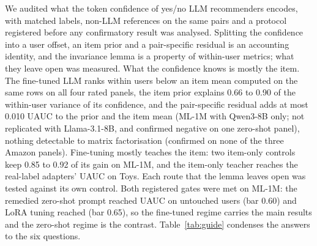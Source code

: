 We audited what the token confidence of yes/no LLM recommenders encodes, with matched labels, non-LLM references on the same pairs
and a protocol registered before any confirmatory result was analysed. Splitting the confidence into a user offset, an item prior
and a pair-specific residual is an accounting identity, and the invariance lemma is a property of within-user metrics; what they
leave open was measured.
What the confidence knows is mostly the item. The fine-tuned LLM ranks within users below an item mean computed on the same rows on
all four rated panels, the item prior explains 0.66 to 0.90 of the within-user variance of its confidence, and the pair-specific
residual adds at most 0.010 UAUC to the prior and the item mean (ML-1M with Qwen3-8B only; not replicated with Llama-3.1-8B, and
confirmed negative on one zero-shot panel), nothing detectable to matrix factorisation (confirmed on none of the three Amazon
panels). Fine-tuning mostly teaches the item: two item-only controls keep 0.85 to 0.92 of its gain on ML-1M, and the item-only teacher
reaches the real-label adapters' UAUC on Toys. Each route that the lemma leaves open was tested against its own control.
Both registered gates were met on ML-1M: the remedied zero-shot prompt reached UAUC  on untouched users
(bar 0.60) and LoRA tuning reached  (bar 0.65), so the fine-tuned regime carries the
main results and the zero-shot regime is the contrast. Table~\ref{tab:guide} condenses the answers to the six questions.

